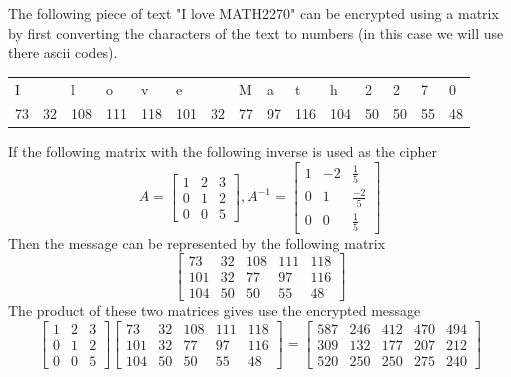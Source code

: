 \documentclass{../mathhomework}
\begin{document}
The following piece of text "I love MATH2270" can be encrypted using a matrix by first converting the characters
of the text to numbers (in this case we will use there ascii codes).
\begin{table}[H]
    \begin{tabular}{lllllllllllllll}
    I  &    & l   & o   & v   & e   &    & M  & a  & t   & h   & 2  & 2  & 7  & 0  \\
    73 & 32 & 108 & 111 & 118 & 101 & 32 & 77 & 97 & 116 & 104 & 50 & 50 & 55 & 48
    \end{tabular}
\end{table}
\noindent If the following matrix with the following inverse is used as the cipher
\begin{equation*}
    A = \begin{bmatrix}
        1 & 2 & 3 \\
        0 & 1 & 2 \\
        0 & 0 & 5
    \end{bmatrix},
    A^{-1} = \begin{bmatrix}
        1 & -2 & \frac{1}{5} \\ 
        0 & 1 & \frac{-2}{5} \\
        0 & 0 & \frac{1}{5}
    \end{bmatrix}
\end{equation*}
Then the message can be represented by the following matrix
\begin{equation*}
    \begin{bmatrix}
        73 & 32 & 108 & 111 & 118 \\ 
        101 & 32 & 77 & 97 & 116 \\ 
        104 & 50 & 50 & 55 & 48
    \end{bmatrix}
\end{equation*}
The product of these two matrices gives use the encrypted message
\begin{equation*}
    \begin{bmatrix}
        1 & 2 & 3 \\
        0 & 1 & 2 \\
        0 & 0 & 5
    \end{bmatrix}
    \begin{bmatrix}
        73 & 32 & 108 & 111 & 118 \\ 
        101 & 32 & 77 & 97 & 116 \\ 
        104 & 50 & 50 & 55 & 48
    \end{bmatrix} = \begin{bmatrix}
        587 & 246 & 412 & 470 & 494 \\
        309 & 132 & 177 & 207 & 212 \\
        520 & 250 & 250 & 275 & 240
    \end{bmatrix}
\end{equation*}
\end{document}
